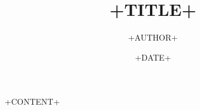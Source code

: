 \documentclass[%
  12pt,
  a4paper %
  ]{report}
\title{+TITLE+}
\author{+AUTHOR+}
\date{+DATE+}
\begin{document}
+CONTENT+
\end{document}
